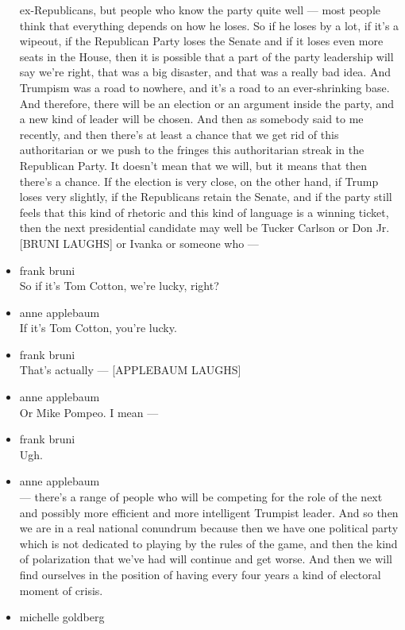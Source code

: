 \begin{itemize}
  ex-Republicans, but people who know the party quite well --- most
  people think that everything depends on how he loses. So if he loses
  by a lot, if it's a wipeout, if the Republican Party loses the Senate
  and if it loses even more seats in the House, then it is possible that
  a part of the party leadership will say we're right, that was a big
  disaster, and that was a really bad idea. And Trumpism was a road to
  nowhere, and it's a road to an ever-shrinking base. And therefore,
  there will be an election or an argument inside the party, and a new
  kind of leader will be chosen. And then as somebody said to me
  recently, and then there's at least a chance that we get rid of this
  authoritarian or we push to the fringes this authoritarian streak in
  the Republican Party. It doesn't mean that we will, but it means that
  then there's a chance. If the election is very close, on the other
  hand, if Trump loses very slightly, if the Republicans retain the
  Senate, and if the party still feels that this kind of rhetoric and
  this kind of language is a winning ticket, then the next presidential
  candidate may well be Tucker Carlson or Don Jr. {[}BRUNI LAUGHS{]} or
  Ivanka or someone who ---
\item
  frank bruni\\
  So if it's Tom Cotton, we're lucky, right?
\item
  anne applebaum\\
  If it's Tom Cotton, you're lucky.
\item
  frank bruni\\
  That's actually --- {[}APPLEBAUM LAUGHS{]}
\item
  anne applebaum\\
  Or Mike Pompeo. I mean ---
\item
  frank bruni\\
  Ugh.
\item
  anne applebaum\\
  --- there's a range of people who will be competing for the role of
  the next and possibly more efficient and more intelligent Trumpist
  leader. And so then we are in a real national conundrum because then
  we have one political party which is not dedicated to playing by the
  rules of the game, and then the kind of polarization that we've had
  will continue and get worse. And then we will find ourselves in the
  position of having every four years a kind of electoral moment of
  crisis.
\item
  michelle goldberg\\

\end{itemize}
